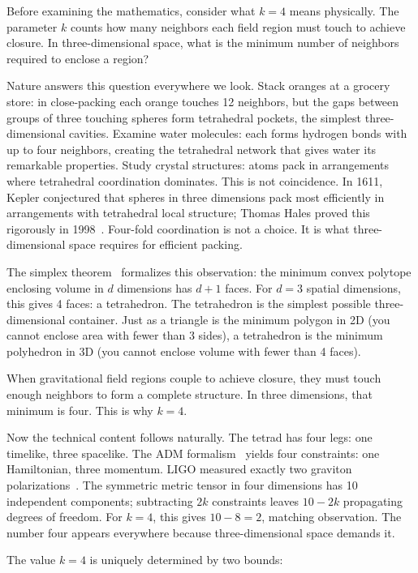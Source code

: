 \documentclass[aps,prd,preprint,superscriptaddress,showpacs,preprintnumbers,amsmath,amssymb,nofootinbib]{revtex4-2}
\begin{document}
Before examining the mathematics, consider what $k = 4$ means physically. The parameter $k$ counts how many neighbors each field region must touch to achieve closure. In three-dimensional space, what is the minimum number of neighbors required to enclose a region?

Nature answers this question everywhere we look. Stack oranges at a grocery store: in close-packing each orange touches 12 neighbors, but the gaps between groups of three touching spheres form tetrahedral pockets, the simplest three-dimensional cavities. Examine water molecules: each forms hydrogen bonds with up to four neighbors, creating the tetrahedral network that gives water its remarkable properties. Study crystal structures: atoms pack in arrangements where tetrahedral coordination dominates. This is not coincidence. In 1611, Kepler conjectured that spheres in three dimensions pack most efficiently in arrangements with tetrahedral local structure; Thomas Hales proved this rigorously in 1998~\cite{hales2005}. Four-fold coordination is not a choice. It is what three-dimensional space requires for efficient packing.

The simplex theorem~\cite{ziegler1995} formalizes this observation: the minimum convex polytope enclosing volume in $d$ dimensions has $d+1$ faces. For $d = 3$ spatial dimensions, this gives 4 faces: a tetrahedron. The tetrahedron is the simplest possible three-dimensional container. Just as a triangle is the minimum polygon in 2D (you cannot enclose area with fewer than 3 sides), a tetrahedron is the minimum polyhedron in 3D (you cannot enclose volume with fewer than 4 faces).

When gravitational field regions couple to achieve closure, they must touch enough neighbors to form a complete structure. In three dimensions, that minimum is four. This is why $k = 4$.

Now the technical content follows naturally. The tetrad has four legs: one timelike, three spacelike. The ADM formalism~\cite{adm1962} yields four constraints: one Hamiltonian, three momentum. LIGO measured exactly two graviton polarizations~\cite{gw170817}. The symmetric metric tensor in four dimensions has 10 independent components; subtracting $2k$ constraints leaves $10 - 2k$ propagating degrees of freedom. For $k = 4$, this gives $10 - 8 = 2$, matching observation. The number four appears everywhere because three-dimensional space demands it.

The value $k = 4$ is uniquely determined by two bounds:
\end{document}
